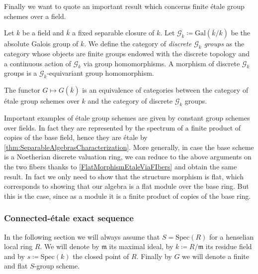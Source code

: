 \noindent
Finally we want to quote an important result which
concerns finite étale group schemes over a field.
\begin{defn}
	Let $k$ be a field and $\overline{k}$ a fixed separable closure of $k$.
	Let $\mathscr{G}_k \coloneqq \mathrm{Gal}\left( \overline{k} / k \right)$ be the
	absolute Galois group of $k$.
	We define the category of {\em discrete $\mathscr{G}_k$ groups} as the category
	whose objects are finite groups endowed with the discrete topology and
	a continuous action of $\mathscr{G}_k$ via group homomorphisms.
	A morphism of discrete $\mathscr{G}_k$ groups is a $\mathscr{G}_k$-equivariant
	group homomorphism.
\end{defn}


\begin{thm}\label{CharacterizationEtaleGroupSchemesK}
	The functor $G \mapsto G(\overline{k})$ is an equivalence of categories
	between the category of étale group schemes over $k$ and the
	category of discrete $\mathscr{G}_k$ groups.
\end{thm}


\begin{ex}[]\label{EtaleConstantGroupScheme}
	Important examples of étale group schemes are given by
	constant group schemes over fields.
	In fact they are represented by the spectrum of a
	finite product of copies of the base field, hence they are étale
	by \cref{thm:SeparableAlgebrasCharacterization}.
	More generally, in case the base scheme is a Noetherian discrete valuation
	ring, we can reduce to the above arguments on the two fibers 
	thanks to \cref{FlatMorphismEtaleViaFIbers} and obtain the same result.
	In fact we only need to show that the structure morphism is flat,
	which corresponds to showing that our algebra is a flat module over the 
	base ring.
	But this is the case, since as a module it is a finite product of copies
	of the base ring.
\end{ex}



\subsubsection{Connected-étale exact sequence}
In the following section we will always assume that 
$S = \mathrm{Spec}(R)$	for a henselian local ring $R$.
We will denote by $\mathfrak{m}$ its maximal ideal, by $k \coloneqq R/\mathfrak{m}$
its residue field and by $s \coloneqq \mathrm{Spec}(k)$ the closed point of $R$.
Finally by $G$ we will denote a finite and flat $S$-group scheme.

